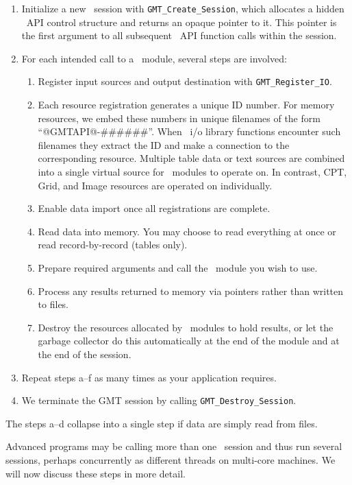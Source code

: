 \documentclass[11pt]{report}
\begin{document}
\begin{enumerate}
\item Initialize a new \GMT\ session with \texttt{GMT\_Create\_Session}, which
allocates a hidden \GMT\ API control structure and returns an opaque pointer to it.  This pointer is
the first argument to all subsequent \GMT\ API function calls within the session.
\item For each intended call to a \GMT\ module, several steps are involved:
\begin{enumerate}
\item Register input sources and output destination with \texttt{GMT\_Register\_IO}.
\item Each resource registration generates a unique ID number.  For memory resources, we embed these numbers
in unique filenames of the form ``@GMTAPI@-\#\#\#\#\#\#''.  When
\GMT\ i/o library functions encounter such filenames they extract the ID and make a connection
to the corresponding resource.  Multiple table data or text sources
are combined into a single virtual source for \GMT\ modules to operate on.
In contrast, CPT, Grid, and Image resources are operated on individually.
\item Enable data import once all registrations are complete.
\item Read data into memory. You may choose to read everything at once or read record-by-record (tables only).
\item Prepare required arguments and call the \GMT\ module you wish to use.
\item Process any results returned to memory via pointers rather than written to files.
\item Destroy the resources allocated by \GMT\ modules to hold results, or let the
garbage collector do this automatically at the end of the module and at the end of the session.
\end{enumerate}
\item Repeat steps a--f as many times as your application requires.
\item We terminate the GMT session by calling \texttt{GMT\_Destroy\_Session}.
\end{enumerate}

The steps a--d collapse into a single step if data are simply read from files.

Advanced programs may be calling more than one \GMT\ session and thus run several
sessions, perhaps concurrently as different threads on multi-core machines.
We will now discuss these steps in more detail.
\end{document}
